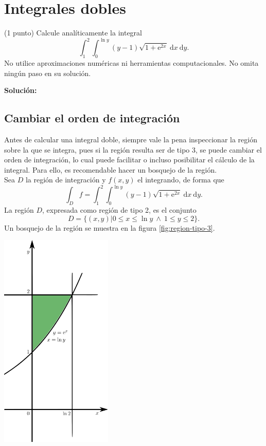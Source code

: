 \documentclass{fmbvecto}
\begin{document}
\section{Integrales dobles}

\begin{problema}
    
    (1 punto) Calcule analíticamente la integral \[ \int_{1}^{2} \int_{0}^{\ln y} (y-1) \sqrt{1 + \mathrm{e}^{2x}} \: \mathrm{d}x \: \mathrm{d}y. \] No utilice aproximaciones numéricas ni herramientas computacionales. No omita ningún paso en su solución.

\tcblower
\textbf{Solución:}

    \subsection{Cambiar el orden de integración}

    Antes de calcular una integral doble, siempre vale la pena inspeccionar la región sobre la que se integra, pues si la región resulta ser de tipo 3, se puede cambiar el orden de integración, lo cual puede facilitar o incluso posibilitar el cálculo de la integral. Para ello, es recomendable hacer un bosquejo de la región. \\
    
    Sea \(D\) la región de integración y \(f(x, y)\) el integrando, de forma que \[ \int_D f = \int_{1}^{2} \int_{0}^{\ln y} (y-1) \sqrt{1 + \mathrm{e}^{2x}} \: \mathrm{d}x \: \mathrm{d}y. \]
    La región \(D\), expresada como región de tipo 2, es el conjunto
    \[D = \{(x, y) | 0 \leq x \leq \ln y \ \land \ 1 \leq y \leq 2\}.\]
    Un bosquejo de la región se muestra en la figura \ref{fig:region-tipo-3}.

    \begin{center}
        \includegraphics[width=0.4\textwidth]{region-tipo-3.png}
        \label{fig:region-tipo-3}
    \end{center}


\end{problema}
\end{document}
